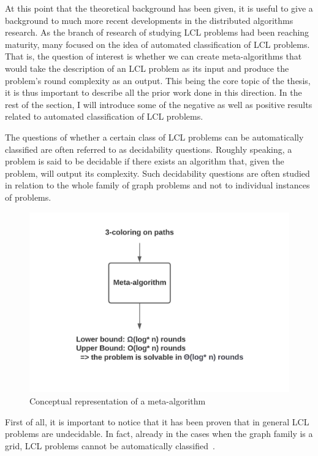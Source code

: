 At this point that the theoretical background has been given, it is
useful to give a background to much more recent developments in the
distributed algorithms research. As the branch of research of
studying LCL problems had been reaching maturity, many focused
on the idea of automated classification of LCL problems. That is,
the question of interest is whether we can create meta-algorithms
that would take the description of an LCL problem as its input
and produce the problem's round complexity as an output.
This being the core topic of the thesis, it is thus important
to describe all the prior work done in this direction.
In the rest of the
section, I will introduce some of the negative as well as positive results
related to automated classification of LCL problems.

The questions of whether a certain class of LCL problems
can be automatically classified are often referred to
as decidability questions. Roughly speaking, a problem is
said to be decidable if there exists an algorithm that,
given the problem, will output its complexity. Such decidability
questions are often studied in relation to the whole
family of graph problems and not to individual instances
of problems.

\begin{figure}[ht]
  \begin{center}
    \includegraphics[width=\textwidth]{images/meta-algorithm.png}
    \caption{Conceptual representation of a meta-algorithm}
    \label{fig:meta-algorithm}
  \end{center}
\end{figure}

First of all, it is important to notice that it has been
proven that in general LCL problems are undecidable.
In fact, already in the cases when the graph family is a grid,
LCL problems cannot be automatically classified~\cite{Brandt2017, Naor1993}.


